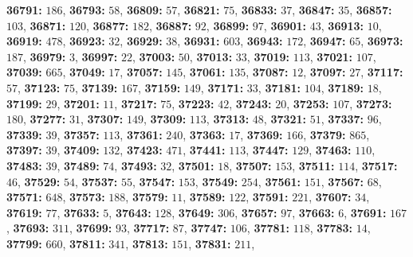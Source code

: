 \textsf{\bfseries 36791:} $186$, \textsf{\bfseries 36793:} $58$, \textsf{\bfseries 36809:} $57$, \textsf{\bfseries 36821:} $75$, \textsf{\bfseries 36833:} $37$, \textsf{\bfseries 36847:} $35$, \textsf{\bfseries 36857:} $103$, \textsf{\bfseries 36871:} $120$, \textsf{\bfseries 36877:} $182$, \textsf{\bfseries 36887:} $92$, \textsf{\bfseries 36899:} $97$, \textsf{\bfseries 36901:} $43$, \textsf{\bfseries 36913:} $10$, \textsf{\bfseries 36919:} $478$, \textsf{\bfseries 36923:} $32$, \textsf{\bfseries 36929:} $38$, \textsf{\bfseries 36931:} $603$, \textsf{\bfseries 36943:} $172$, \textsf{\bfseries 36947:} $65$, \textsf{\bfseries 36973:} $187$, \textsf{\bfseries 36979:} $3$, \textsf{\bfseries 36997:} $22$, \textsf{\bfseries 37003:} $50$, \textsf{\bfseries 37013:} $33$, \textsf{\bfseries 37019:} $113$, \textsf{\bfseries 37021:} $107$, \textsf{\bfseries 37039:} $665$, \textsf{\bfseries 37049:} $17$, \textsf{\bfseries 37057:} $145$, \textsf{\bfseries 37061:} $135$, \textsf{\bfseries 37087:} $12$, \textsf{\bfseries 37097:} $27$, \textsf{\bfseries 37117:} $57$, \textsf{\bfseries 37123:} $75$, \textsf{\bfseries 37139:} $167$, \textsf{\bfseries 37159:} $149$, \textsf{\bfseries 37171:} $33$, \textsf{\bfseries 37181:} $104$, \textsf{\bfseries 37189:} $18$, \textsf{\bfseries 37199:} $29$, \textsf{\bfseries 37201:} $11$, \textsf{\bfseries 37217:} $75$, \textsf{\bfseries 37223:} $42$, \textsf{\bfseries 37243:} $20$, \textsf{\bfseries 37253:} $107$, \textsf{\bfseries 37273:} $180$, \textsf{\bfseries 37277:} $31$, \textsf{\bfseries 37307:} $149$, \textsf{\bfseries 37309:} $113$, \textsf{\bfseries 37313:} $48$, \textsf{\bfseries 37321:} $51$, \textsf{\bfseries 37337:} $96$, \textsf{\bfseries 37339:} $39$, \textsf{\bfseries 37357:} $113$, \textsf{\bfseries 37361:} $240$, \textsf{\bfseries 37363:} $17$, \textsf{\bfseries 37369:} $166$, \textsf{\bfseries 37379:} $865$, \textsf{\bfseries 37397:} $39$, \textsf{\bfseries 37409:} $132$, \textsf{\bfseries 37423:} $471$, \textsf{\bfseries 37441:} $113$, \textsf{\bfseries 37447:} $129$, \textsf{\bfseries 37463:} $110$, \textsf{\bfseries 37483:} $39$, \textsf{\bfseries 37489:} $74$, \textsf{\bfseries 37493:} $32$, \textsf{\bfseries 37501:} $18$, \textsf{\bfseries 37507:} $153$, \textsf{\bfseries 37511:} $114$, \textsf{\bfseries 37517:} $46$, \textsf{\bfseries 37529:} $54$, \textsf{\bfseries 37537:} $55$, \textsf{\bfseries 37547:} $153$, \textsf{\bfseries 37549:} $254$, \textsf{\bfseries 37561:} $151$, \textsf{\bfseries 37567:} $68$, \textsf{\bfseries 37571:} $648$, \textsf{\bfseries 37573:} $188$, \textsf{\bfseries 37579:} $11$, \textsf{\bfseries 37589:} $122$, \textsf{\bfseries 37591:} $221$, \textsf{\bfseries 37607:} $34$, \textsf{\bfseries 37619:} $77$, \textsf{\bfseries 37633:} $5$, \textsf{\bfseries 37643:} $128$, \textsf{\bfseries 37649:} $306$, \textsf{\bfseries 37657:} $97$, \textsf{\bfseries 37663:} $6$, \textsf{\bfseries 37691:} $167$, \textsf{\bfseries 37693:} $311$, \textsf{\bfseries 37699:} $93$, \textsf{\bfseries 37717:} $87$, \textsf{\bfseries 37747:} $106$, \textsf{\bfseries 37781:} $118$, \textsf{\bfseries 37783:} $14$, \textsf{\bfseries 37799:} $660$, \textsf{\bfseries 37811:} $341$, \textsf{\bfseries 37813:} $151$, \textsf{\bfseries 37831:} $211$, 
